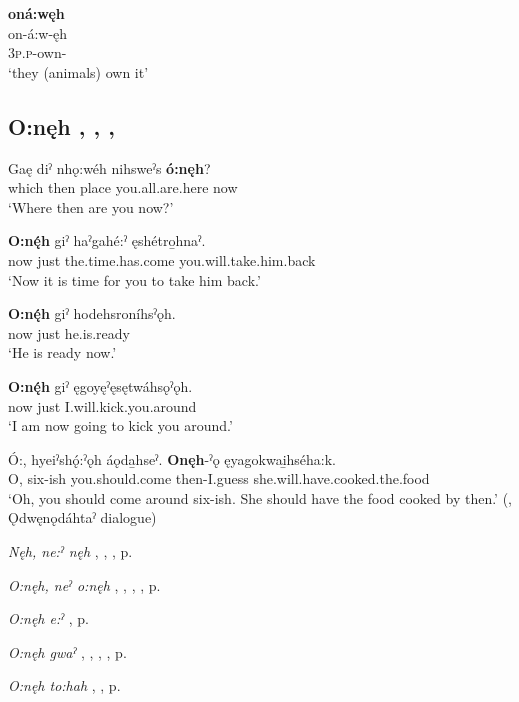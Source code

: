 \ea
\label{ex:opart22}
\glll \textbf{oná:węh} {}\\
on-á:w-ęh\\
\textsc{3p.p}-own-{\stative}\\
\glt ‘they (animals) own it’
\z


\subsection*{\textbf{O:nęh} , , , } \label{p:[o:nęh]}

\ea
\label{ex:opart23}
\gll Gaę diˀ nhǫ:wéh nihsweˀs \textbf{ó:nęh}?\\
which then place you.all.are.here now\\
\glt ‘Where then are you now?’
\z

\ea
\label{ex:opart24}
\gll \textbf{O:nę́h} giˀ haˀgahé:ˀ ęshétro̱hnaˀ.\\
now just the.time.has.come you.will.take.him.back\\
\glt ‘Now it is time for you to take him back.’
\z

\ea
\label{ex:opart25}
\gll \textbf{O:nę́h} giˀ hodehsroníhsˀǫh.\\
now just he.is.ready\\
\glt ‘He is ready now.’
\z

\ea
\label{ex:opart26}
\gll \textbf{O:nę́h} giˀ ęgoyęˀęsętwáhsǫˀǫh.\\
now just I.will.kick.you.around\\
\glt ‘I am now going to kick you around.’
\z

\ea
\label{ex:opart27}
\gll Ó:, hyeiˀshǫ́:ˀǫh áǫda̱hseˀ. \textbf{Onęh}-ˀǫ ęyagokwai̱hséha:k.\\
O, six-ish you.should.come then-I.guess she.will.have.cooked.the.food\\
\glt ‘Oh, you should come around six-ish. She should have the food cooked by then.’ (\cite[279]{mithun_watewayestanih_1984}, Ǫdwęnǫdáhtaˀ dialogue)
\z

\begin{CayugaRelated}
\item \textit{Nęh, ne:ˀ nęh} , , , p. \pageref{p:[nęh, ne:ˀ nęh]}\\
\item \textit{O:nęh, neˀ o:nęh} , , , , p. \pageref{p:[o:nęh]}\\
\item \textit{O:nęh e:ˀ} , p. \pageref{p:[o:nęh e:ˀ]}\\
\item \textit{O:nęh gwaˀ} , , , , p. \pageref{p:[o:nęh gwaˀ]}\\
\item \textit{O:nęh to:hah} , , p. \pageref{p:o:nęh to:hah]}
\end{CayugaRelated}



